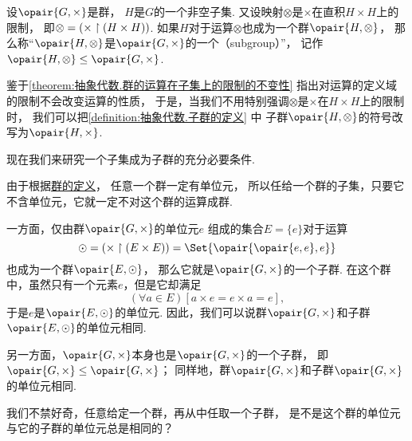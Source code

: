 \begin{definition}\label{definition:抽象代数.子群的定义}
设\(\opair{G,\times}\)是群，
\(H\)是\(G\)的一个非空子集.
又设映射\(\otimes\)是\(\times\)在直积\(H \times H\)上的限制，
即\(\otimes = (\times \upharpoonright(H \times H))\).
如果\(H\)对于运算\(\otimes\)也成为一个群\(\opair{H,\otimes}\)，
那么称“\(\opair{H,\otimes}\)是\(\opair{G,\times}\)的一个（subgroup）”，
记作\(\opair{H,\otimes} \AlgebraSubstructure \opair{G,\times}\).
\end{definition}

鉴于\cref{theorem:抽象代数.群的运算在子集上的限制的不变性}
指出对运算的定义域的限制不会改变运算的性质，
于是，当我们不用特别强调\(\otimes\)是\(\times\)在\(H\times H\)上的限制时，
我们可以把\cref{definition:抽象代数.子群的定义} 中
子群\(\opair{H,\otimes}\)的符号改写为\(\opair{H,\times}\).

现在我们来研究一个子集成为子群的充分必要条件.

由于根据\hyperref[definition:抽象代数.群的定义]{群的定义}，
任意一个群一定有单位元，
所以任给一个群的子集，只要它不含单位元，它就一定不对这个群的运算成群.

一方面，仅由群\(\opair{G,\times}\)的单位元\(e\)%
组成的集合\(E=\{e\}\)对于运算\begin{equation*}
	\odot=(\times\SetRestrict(E\times E))
	= \Set{\opair{\opair{e,e},e}}
\end{equation*}
也成为一个群\(\opair{E,\odot}\)，
那么它就是\(\opair{G,\times}\)的一个子群.
在这个群中，虽然只有一个元素\(e\)，但是它却满足\begin{equation*}
	(\forall a \in E)[a \times e = e \times a = e],
\end{equation*}
于是\(e\)是\(\opair{E,\odot}\)的单位元.
因此，我们可以说群\(\opair{G,\times}\)和子群\(\opair{E,\odot}\)的单位元相同.

另一方面，\(\opair{G,\times}\)本身也是\(\opair{G,\times}\)的一个子群，
即\(\opair{G,\times}\AlgebraSubstructure\opair{G,\times}\)；
同样地，群\(\opair{G,\times}\)和子群\(\opair{G,\times}\)的单位元相同.

我们不禁好奇，任意给定一个群，再从中任取一个子群，
是不是这个群的单位元与它的子群的单位元总是相同的？

